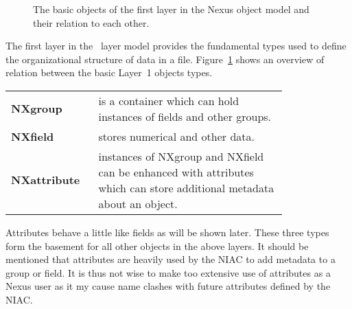\begin{figure}[tb]
    \centering
    \begin{minipage}[c]{0.6\linewidth}
    \centering
    \end{minipage}
    \hfill
    \begin{minipage}[c]{0.39\linewidth}
    \caption{{\small The basic objects of the first layer in the Nexus object
    model and their relation to each other.}}
    \label{fig:nxintro:layer1}
    \end{minipage}
\end{figure}

The first layer in the \nexus\ layer model provides the fundamental types used 
to define the organizational structure of data in a file.
Figure~\ref{fig:nxintro:layer1} shows an overview of relation between the basic
Layer~1 objects types.
\begin{center}
\renewcommand{\arraystretch}{1.5}
\begin{tabular}{m{0.2\linewidth}m{0.6\linewidth}}
    \textbf{NXgroup} &  is a container which can hold instances of fields and 
        other groups. \\
    \textbf{NXfield}  & stores numerical and other data. \\
    \textbf{NXattribute} & instances of NXgroup and NXfield can be enhanced with
        attributes which can store additional metadata about an object.
\end{tabular}
\end{center}
Attributes behave a little like fields as will be shown later. These three types
form the basement for all other objects in the above layers. 
It should be mentioned that attributes are heavily used by the NIAC to add
metadata to a group or field. It is thus not wise to make too extensive use of
attributes as a Nexus user as it my cause name clashes with future attributes
defined by the NIAC.


